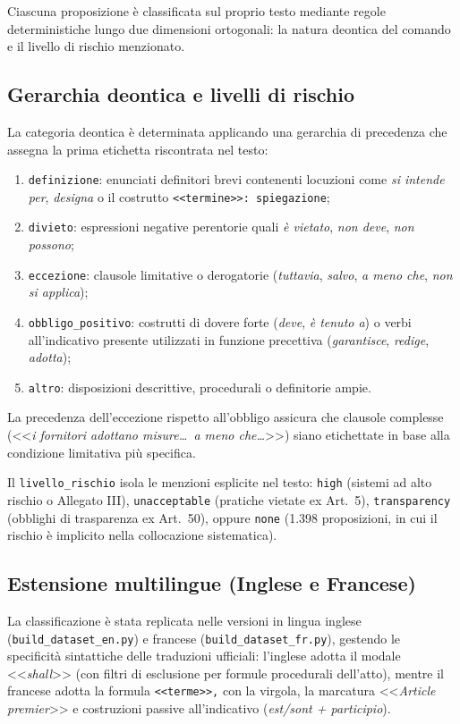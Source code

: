 \documentclass[12pt,a4paper,oneside]{report}
\begin{document}
Ciascuna proposizione è classificata sul proprio testo mediante regole deterministiche lungo due dimensioni ortogonali: la natura deontica del comando e il livello di rischio menzionato.

\subsection{Gerarchia deontica e livelli di rischio}
La categoria deontica è determinata applicando una gerarchia di precedenza che assegna la prima etichetta riscontrata nel testo:
\begin{enumerate}
    \item \texttt{definizione}: enunciati definitori brevi contenenti locuzioni come \emph{si intende per}, \emph{designa} o il costrutto \texttt{<<termine>>: spiegazione};
    \item \texttt{divieto}: espressioni negative perentorie quali \emph{è vietato}, \emph{non deve}, \emph{non possono};
    \item \texttt{eccezione}: clausole limitative o derogatorie (\emph{tuttavia}, \emph{salvo}, \emph{a meno che}, \emph{non si applica});
    \item \texttt{obbligo\_positivo}: costrutti di dovere forte (\emph{deve}, \emph{è tenuto a}) o verbi all'indicativo presente utilizzati in funzione precettiva (\emph{garantisce}, \emph{redige}, \emph{adotta});
    \item \texttt{altro}: disposizioni descrittive, procedurali o definitorie ampie.
\end{enumerate}
La precedenza dell'eccezione rispetto all'obbligo assicura che clausole complesse (<<\emph{i fornitori adottano misure\dots\ a meno che\dots}>>) siano etichettate in base alla condizione limitativa più specifica.

Il \texttt{livello\_rischio} isola le menzioni esplicite nel testo: \texttt{high} (sistemi ad alto rischio o Allegato III), \texttt{unacceptable} (pratiche vietate ex Art.~5), \texttt{transparency} (obblighi di trasparenza ex Art.~50), oppure \texttt{none} (1.398 proposizioni, in cui il rischio è implicito nella collocazione sistematica).

\subsection{Estensione multilingue (Inglese e Francese)}
La classificazione è stata replicata nelle versioni in lingua inglese (\texttt{build\_dataset\_en.py}) e francese (\texttt{build\_dataset\_fr.py}), gestendo le specificità sintattiche delle traduzioni ufficiali: l'inglese adotta il modale <<\emph{shall}>> (con filtri di esclusione per formule procedurali dell'atto), mentre il francese adotta la formula \texttt{<<terme>>,} con la virgola, la marcatura <<\emph{Article premier}>> e costruzioni passive all'indicativo (\emph{est/sont + participio}).
\end{document}
